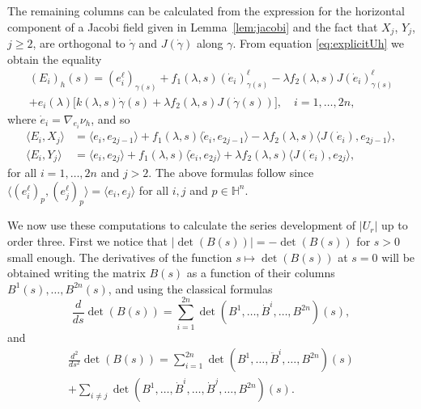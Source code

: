 \documentclass[10pt]{amsart}
\theoremstyle{definition}
\theoremstyle{remark}
\numberwithin{equation}{section}
\begin{document}
The remaining columns can be calculated from the expression for the horizontal component of a Jacobi field given in Lemma~\ref{lem:jacobi} and the fact that $X_j$, $Y_j$, $j{\geqslant} 2$, are orthogonal to ${\dot{\gamma}}$ and $J({\dot{\gamma}})$ along ${\gamma}$. From equation \eqref{eq:explicitUh} we obtain the equality
\begin{multline*}
(E_i)_h(s)=(e_i^\ell)_{{\gamma}(s)}+f_1({\lambda},s)(\dot{e}_i)^\ell_{{\gamma}(s)}-{\lambda} f_2({\lambda},s)J(\dot{e}_i)^\ell_{{\gamma}(s)}
\\
+e_i({\lambda})\big[k({\lambda},s){\dot{\gamma}}(s)+{\lambda} f_2({\lambda},s)J({\dot{\gamma}}(s))\big], \quad i= 1,\ldots,2n,
\end{multline*}
where $\dot{e}_i=\nabla_{e_i}{\nu_{h}}$, and so
\begin{equation}
\label{eq:Bj}
\begin{split}
{\langle{E_i,X_j}\rangle}&={\langle{e_i,e_{2j-1}}\rangle}+f_1({\lambda},s){\langle{\dot{e}_i,e_{2j-1}}\rangle}-{\lambda} f_2({\lambda},s){\langle{J(\dot{e}_i),e_{2j-1}}\rangle},
\\
{\langle{E_i,Y_j}\rangle}&={\langle{e_i,e_{2j}}\rangle}+f_1({\lambda},s){\langle{\dot{e}_i,e_{2j}}\rangle}+{\lambda} f_2({\lambda},s){\langle{J(\dot{e}_i),e_{2j}}\rangle},
\end{split}
\end{equation}
for all $i=1,\ldots,2n$ and $j>2$. The above formulas follow since ${\langle{(e_i^\ell)_p,(e_j^\ell)_p}\rangle}={\langle{e_i,e_j}\rangle}$ for all $i,j$ and $p\in{{\mathbb{H}}}^n$.

We now use these computations to calculate the series development of $|U_r|$ up to order three. First we notice that $|\det(B(s))|=-\det(B(s))$ for $s>0$ small enough. The derivatives of the function $s\mapsto\det(B(s))$ at $s=0$ will be obtained writing the matrix $B(s)$ as a function of their columns $B^1(s),\ldots,B^{2n}(s)$, and using the classical formulas
\begin{equation*}
\frac{d}{ds}\det(B(s))=\sum_{i=1}^{2n} \det(B^1,\ldots, \dot{B}^i,\ldots,B^{2n})(s),
\end{equation*}
and
\begin{multline*}
\frac{d^2}{ds^2}\det(B(s))=\sum_{i=1}^{2n}\det(B^1,\ldots,\ddot{B}^i,\ldots,B^{2n})(s)
\\
+\sum_{i\neq j} \det(B^1,\ldots,\dot{B}^i,\ldots,\dot{B}^j,\ldots,B^{2n})(s).
\end{multline*}
\end{document}
